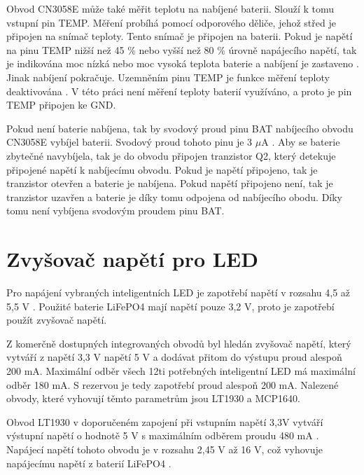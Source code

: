 Obvod CN3058E může také měřit teplotu na nabíjené baterii. Slouží k tomu vstupní pin TEMP. Měření probíhá pomocí odporového děliče, jehož střed je připojen na snímač 
teploty. Tento snímač je připojen na baterii. Pokud je napětí na pinu TEMP nižší než 45 \% nebo vyšší než 80 \% úrovně napájecího napětí, tak je indikována moc nízká
nebo moc vysoká teplota baterie a nabíjení je zastaveno \cite{charger_dtsh}. Jinak nabíjení pokračuje. Uzemněním pinu TEMP je funkce měření teploty deaktivována \cite{charger_dtsh}. 
V této práci není měření teploty baterií využíváno, a proto je pin TEMP připojen ke GND. 


Pokud není baterie nabíjena, tak by svodový proud pinu BAT nabíjecího obvodu CN3058E vybíjel baterii. Svodový proud tohoto pinu je 3 $\mu$A \cite{charger_dtsh}. 
Aby se baterie zbytečné navybíjela, tak je do obvodu připojen tranzistor Q2, který detekuje připojené napětí k nabíjecímu obvodu. Pokud je napětí připojeno, tak je 
tranzistor otevřen a baterie je nabíjena. Pokud napětí připojeno není, tak je tranzistor uzavřen a baterie je díky tomu odpojena od nabíjecího obodu. Díky tomu 
není vybíjena svodovým proudem pinu BAT. 

\section{Zvyšovač napětí pro LED}
Pro napájení vybraných inteligentních LED je zapotřebí napětí v rozsahu 4,5 až 5,5 V \cite{WS2812C_dtsh}. Použité baterie LiFePO4 mají napětí pouze 3,2 V, proto je 
zapotřebí použít zvyšovač napětí. 

Z komerčně dostupných integrovaných obvodů byl hledán zvyšovač napětí, který vytváří z napětí 3,3 V napětí 5 V a dodávat přitom do výstupu proud alespoň 200 mA. 
Maximální odběr všech 12ti potřebných inteligentní LED má maximální odběr 180 mA. S rezervou je tedy zapotřebí proud alespoň 200 mA. Nalezené obvody, které vyhovují 
těmto parametrům jsou LT1930 a MCP1640. 

Obvod LT1930 v doporučeném zapojení při vstupním napětí 3,3V vytváří výstupní napětí o hodnotě 5 V s maximálním odběrem proudu 480 mA \cite{LT1930_dtsh}. Napájecí napětí 
tohoto obvodu je v rozsahu 2,45 V až 16 V, což vyhovuje napájecímu napětí z baterií LiFePO4 \cite{LT1930_dtsh}.



